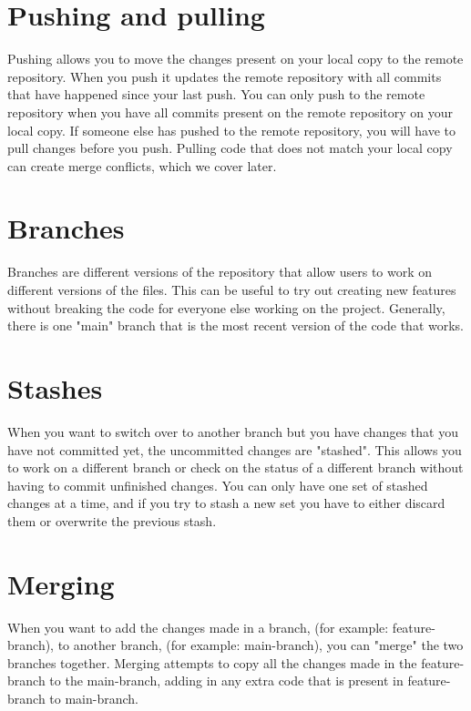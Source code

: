\documentclass[10pt,twocolumn]{article}
\begin{document}
\section{Pushing and pulling}

    Pushing allows you to move the changes present on your local copy to the remote repository. When you push it updates the remote repository with all commits that have happened since your last push. You can only push to the remote repository when you have all commits present on the remote repository on your local copy. If someone else has pushed to the remote repository, you will have to pull changes before you push. Pulling code that does not match your local copy can create merge conflicts, which we cover later.
    
\section{Branches}

    Branches are different versions of the repository that allow users to work on different versions of the files. This can be useful to try out creating new features without breaking the code for everyone else working on the project. Generally, there is one "main" branch that is the most recent version of the code that works. 

\section{Stashes}

    When you want to switch over to another branch but you have changes that you have not committed yet, the uncommitted changes are "stashed". This allows you to work on a different branch or check on the status of a different branch without having to commit unfinished changes. You can only have one set of stashed changes at a time, and if you try to stash a new set you have to either discard them or overwrite the previous stash.
    
\section{Merging}

    When you want to add the changes made in a branch, (for example: feature-branch), to another branch, (for example: main-branch), you can "merge" the two branches together. Merging attempts to copy all the changes made in the feature-branch to the main-branch, adding in any extra code that is present in feature-branch to main-branch.
\end{document}
